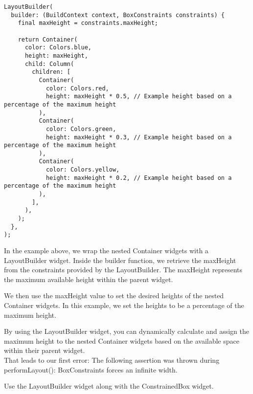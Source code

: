 \begin{lstlisting}
LayoutBuilder(
  builder: (BuildContext context, BoxConstraints constraints) {
    final maxHeight = constraints.maxHeight;

    return Container(
      color: Colors.blue,
      height: maxHeight,
      child: Column(
        children: [
          Container(
            color: Colors.red,
            height: maxHeight * 0.5, // Example height based on a percentage of the maximum height
          ),
          Container(
            color: Colors.green,
            height: maxHeight * 0.3, // Example height based on a percentage of the maximum height
          ),
          Container(
            color: Colors.yellow,
            height: maxHeight * 0.2, // Example height based on a percentage of the maximum height
          ),
        ],
      ),
    );
  },
);
\end{lstlisting}

In the example above, we wrap the nested Container widgets with a LayoutBuilder widget. Inside the builder function, 
we retrieve the maxHeight from the constraints provided by the LayoutBuilder. The maxHeight represents the 
maximum available height within the parent widget.

We then use the maxHeight value to set the desired heights of the nested Container widgets. In this example, 
we set the heights to be a percentage of the maximum height.

By using the LayoutBuilder widget, you can dynamically calculate and assign the maximum height to the nested 
Container widgets based on the available space within their parent widget.\\

That leads to our first error: The following assertion was thrown during performLayout(): 
BoxConstraints forces an infinite width.

Use the LayoutBuilder widget along with the ConstrainedBox widget.

